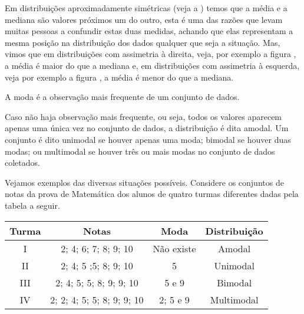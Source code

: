 Em distribuições aproximadamente simétricas (veja a {\hyperref[\detokenize{PE104-1:fig-simetria}]{}} ) temos que a média e a mediana são valores próximos um do outro, esta é uma das razões que levam muitas pessoas a confundir estas duas medidas, achando que elas representam a mesma posição na distribuição dos dados qualquer que seja a situação. Mas, vimos que em distribuições com assimetria à direita, veja, por exemplo a figura  {\hyperref[\detokenize{PE104-1:fig-assimetriaadireita}]{}}, a média é maior do que a mediana e, em distribuições com assimetria à esquerda, veja por exemplo a figura {\hyperref[\detokenize{PE104-1:fig-assimetriaaesquerda}]{}}, a média é menor do que a mediana.


A moda é a observação mais frequente de um conjunto de dados.

Caso não haja observação mais frequente, ou seja, todos os valores aparecem apenas uma única vez no conjunto de dados, a distribuição é dita amodal. Um conjunto é dito unimodal se houver apenas uma moda; bimodal se houver duas modas; ou multimodal se houver três ou mais modas no conjunto de dados coletados.

Vejamos exemplos das diversas situações possíveis. Considere os conjuntos de notas da prova de Matemática dos alunos de quatro turmas diferentes dadas pela tabela a seguir.


\begin{savenotes}\sphinxattablestart
\centering
{}
\label{\detokenize{PE104-1:id17}}
\sphinxaftercaption
\begin{tabulary}{\linewidth}[t]{|c|c|c|c|}
\hline

Turma
&
Notas
&
Moda
&
Distribuição
\\
\hline
I
&
2; 4; 6; 7; 8; 9; 10
&
Não existe
&
Amodal
\\
\hline
II
&
2; 4; 5 ;5; 8; 9; 10
&
5
&
Unimodal
\\
\hline
III
&
2; 4; 5; 5; 8; 9; 9; 10
&
5 e 9
&
Bimodal
\\
\hline
IV
&
2; 2; 4; 5; 5; 8; 9; 9; 10
&
2; 5 e 9
&
Multimodal
\\
\hline
\end{tabulary}
\par
\sphinxattableend\end{savenotes}

